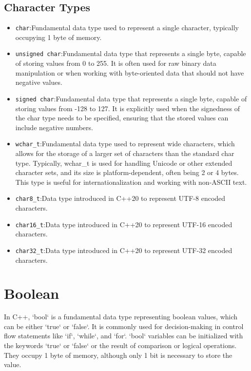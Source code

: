 \documentclass[12pt]{article}
\begin{document}
\subsection{Character Types}
\begin{itemize}
    \item \texttt{char}:Fundamental data type used to represent a single character, typically occupying 1 byte of memory.
    \item \texttt{unsigned char}:Fundamental data type that represents a single byte, capable of storing values from 0 to 255. It is often used for raw binary data manipulation or when working with byte-oriented data that should not have negative values.
    \item \texttt{signed char}:Fundamental data type that represents a single byte, capable of storing values from -128 to 127. It is explicitly used when the signedness of the char type needs to be specified, ensuring that the stored values can include negative numbers.
    \item \texttt{wchar\_t}:Fundamental data type used to represent wide characters, which allows for the storage of a larger set of characters than the standard char type. Typically, wchar\_t is used for handling Unicode or other extended character sets, and its size is platform-dependent, often being 2 or 4 bytes. This type is useful for internationalization and working with non-ASCII text.
    \item \texttt{char8\_t}:Data type introduced in C++20 to represent UTF-8 encoded characters.
    \item \texttt{char16\_t}:Data type introduced in C++20 to represent UTF-16 encoded characters.
    \item \texttt{char32\_t}:Data type introduced in C++20 to represent UTF-32 encoded characters.
\end{itemize}
\section{Boolean}
In C++, `bool` is a fundamental data type representing boolean values, which can be either `true` or `false`. It is commonly used for decision-making in control flow statements like `if`, `while`, and `for`. `bool` variables can be initialized with the keywords `true` or `false` or the result of comparison or logical operations. They occupy 1 byte of memory, although only 1 bit is necessary to store the value. 
\newpage
\end{document}
